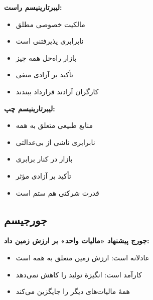 \begin{tcolorbox}[
    enhanced,
    colback=violet!8,
    colframe=violet,
    boxrule=1.5pt,
    arc=5pt,
    fonttitle=\bfseries,
    title={\rl{🟣 مقایسهٔ دیدگاه‌ها: لیبرتارینیسم راست و چپ}}
]

\textbf{لیبرتارینیسم راست:}
\begin{itemize}[itemsep=1.5ex, leftmargin=*, topsep=0.5ex]
    \item مالکیت خصوصی مطلق
    \item نابرابری پذیرفتنی است
    \item بازار راه‌حل همه چیز
    \item تأکید بر آزادی منفی
    \item کارگران آزادند قرارداد ببندند
\end{itemize}



\textbf{لیبرتارینیسم چپ:}
\begin{itemize}[itemsep=1.5ex, leftmargin=*, topsep=0.5ex]
    \item منابع طبیعی متعلق به همه
    \item نابرابری ناشی از بی‌عدالتی
    \item بازار در کنار برابری
    \item تأکید بر آزادی مؤثر
    \item قدرت شرکتی هم ستم است
\end{itemize}
\end{tcolorbox}

\subsection{جورجیسم}


\noindent{}

\textbf{جورج پیشنهاد «مالیات واحد» بر ارزش زمین داد:}
\begin{itemize}[itemsep=1.5ex, leftmargin=*, topsep=0.5ex]
    \item عادلانه است: ارزش زمین متعلق به همه است
    \item کارآمد است: انگیزهٔ تولید را کاهش نمی‌دهد
    \item همهٔ مالیات‌های دیگر را جایگزین می‌کند
\end{itemize}



